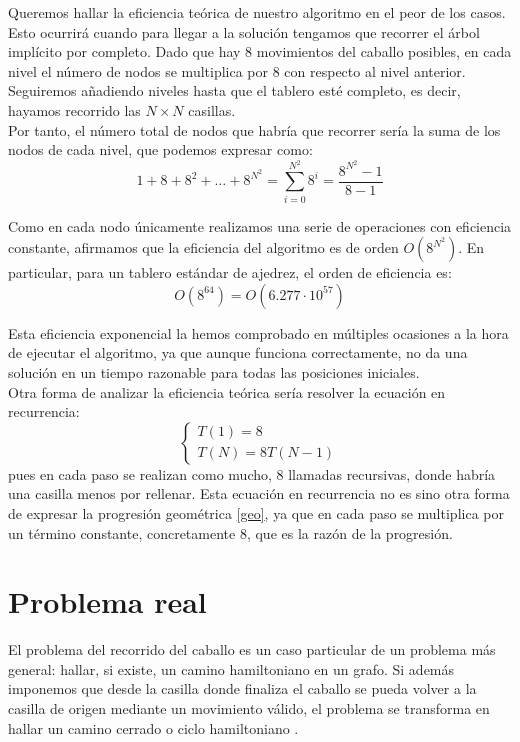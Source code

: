 \documentclass[11pt]{article}
\begin{document}
Queremos hallar la eficiencia teórica de nuestro algoritmo en el peor de los casos. Esto ocurrirá cuando para llegar a la solución tengamos que recorrer el árbol implícito por completo. Dado que hay 8 movimientos del caballo posibles, en cada nivel el número de nodos se multiplica por 8 con respecto al nivel anterior. Seguiremos añadiendo niveles hasta que el tablero esté completo, es decir, hayamos recorrido las $N \times N$ casillas.\\

Por tanto, el número total de nodos que habría que recorrer sería la suma de los nodos de cada nivel, que podemos expresar como:
\begin{equation} \label{geo}
1 + 8 + 8^2 + \hdots + 8^{N^2} = \sum_{i=0}^{N^2} 8^i = \frac{8^{N^2} - 1}{8 - 1}
\end{equation}

Como en cada nodo únicamente realizamos una serie de operaciones con eficiencia constante, afirmamos que la eficiencia del algoritmo es de orden $O\left( 8^{N^2} \right)$. En particular, para un tablero estándar de ajedrez, el orden de eficiencia es: $$ O(8^{64}) = O(6.277 \cdot 10^{57} )$$

Esta eficiencia exponencial la hemos comprobado en múltiples ocasiones a la hora de ejecutar el algoritmo, ya que aunque funciona correctamente, no da una solución en un tiempo razonable para todas las posiciones iniciales.\\

Otra forma de analizar la eficiencia teórica sería resolver la ecuación en recurrencia: $$\begin{cases} T(1) = 8\\
                             T(N) = 8T(N-1)
\end{cases}$$ pues en cada paso se realizan como mucho, $8$ llamadas recursivas, donde habría una casilla menos por rellenar. Esta ecuación en recurrencia no es sino otra forma de expresar la progresión geométrica \eqref{geo}, ya que en cada paso se multiplica por un término constante, concretamente $8$, que es la razón de la progresión.


\section*{Problema real}

El problema del recorrido del caballo es un caso particular de un problema más general: hallar, si existe, un camino hamiltoniano \cite{wiki} en un grafo. Si además imponemos que desde la casilla donde finaliza el caballo se pueda volver a la casilla de origen mediante un movimiento válido, el problema se transforma en hallar un camino cerrado o ciclo hamiltoniano \cite{wiki}.\\
\end{document}
